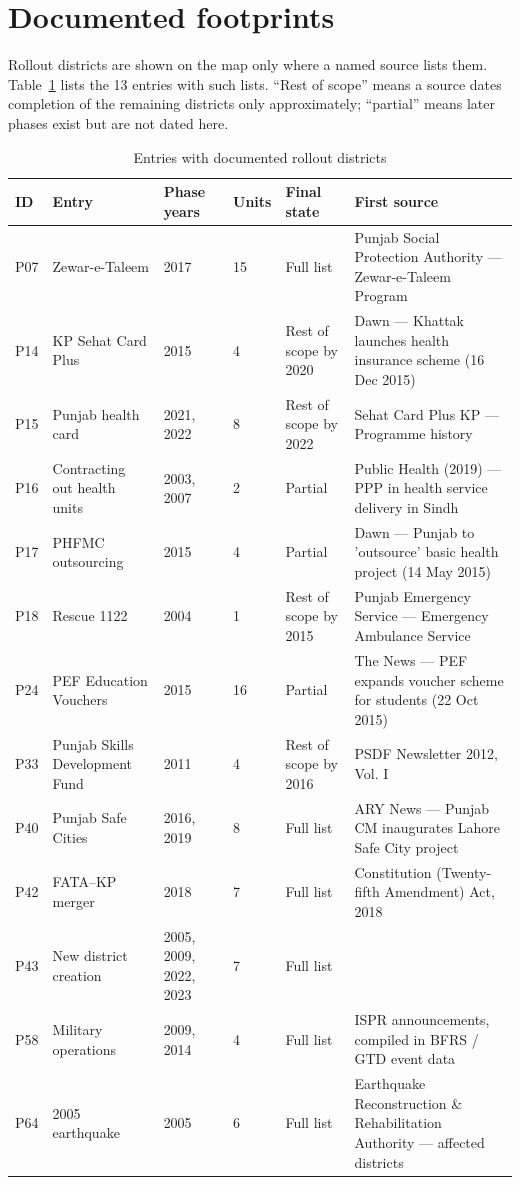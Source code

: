 \documentclass[11pt]{article}
\begin{document}
\section{Documented footprints}
Rollout districts are shown on the map only where a named source lists them. Table~\ref{tab:fp} lists the 13 entries with such lists. ``Rest of scope'' means a source dates completion of the remaining districts only approximately; ``partial'' means later phases exist but are not dated here.

\begin{table}[ht]\centering\scriptsize
\caption{Entries with documented rollout districts}\label{tab:fp}
\begin{tabularx}{\linewidth}{lllllX}\toprule
ID & Entry & Phase years & Units & Final state & First source\\\midrule
P07 & Zewar-e-Taleem & 2017 & 15 & Full list & Punjab Social Protection Authority --- Zewar-e-Taleem Program \\
P14 & KP Sehat Card Plus & 2015 & 4 & Rest of scope by 2020 & Dawn --- Khattak launches health insurance scheme (16 Dec 2015) \\
P15 & Punjab health card & 2021, 2022 & 8 & Rest of scope by 2022 & Sehat Card Plus KP --- Programme history \\
P16 & Contracting out health units & 2003, 2007 & 2 & Partial & Public Health (2019) --- PPP in health service delivery in Sindh \\
P17 & PHFMC outsourcing & 2015 & 4 & Partial & Dawn --- Punjab to 'outsource' basic health project (14 May 2015) \\
P18 & Rescue 1122 & 2004 & 1 & Rest of scope by 2015 & Punjab Emergency Service --- Emergency Ambulance Service \\
P24 & PEF Education Vouchers & 2015 & 16 & Partial & The News --- PEF expands voucher scheme for students (22 Oct 2015) \\
P33 & Punjab Skills Development Fund & 2011 & 4 & Rest of scope by 2016 & PSDF Newsletter 2012, Vol. I \\
P40 & Punjab Safe Cities & 2016, 2019 & 8 & Full list & ARY News --- Punjab CM inaugurates Lahore Safe City project \\
P42 & FATA--KP merger & 2018 & 7 & Full list & Constitution (Twenty-fifth Amendment) Act, 2018 \\
P43 & New district creation & 2005, 2009, 2022, 2023 & 7 & Full list &  \\
P58 & Military operations & 2009, 2014 & 4 & Full list & ISPR announcements, compiled in BFRS / GTD event data \\
P64 & 2005 earthquake & 2005 & 6 & Full list & Earthquake Reconstruction \& Rehabilitation Authority --- affected districts \\
\bottomrule\end{tabularx}
\end{table}
\end{document}
